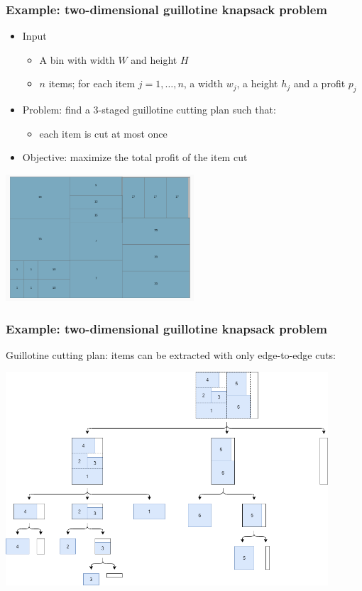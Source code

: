 \documentclass[10pt]{beamer}
\begin{document}
\begin{frame}
  \frametitle{Example: two-dimensional guillotine knapsack problem}

  \begin{itemize}
    \item Input
      \begin{itemize}
        \item A bin with width $W$ and height $H$
        \item $n$ items; for each item $j = 1, \dots, n$, a width $w_j$, a height $h_j$ and a profit $p_j$
      \end{itemize}
    \item Problem: find a 3-staged guillotine cutting plan such that:
      \begin{itemize}
        \item each item is cut at most once
      \end{itemize}
    \item Objective: maximize the total profit of the item cut
  \end{itemize}

  \begin{center}
    \includegraphics[width=7cm]{img/packing_guillotine.png}
  \end{center}
\end{frame}

\begin{frame}
  \frametitle{Example: two-dimensional guillotine knapsack problem}

  Guillotine cutting plan: items can be extracted with only edge-to-edge cuts:
  \begin{center}
    \includegraphics[width=0.9\textwidth]{img/guillotine_cutting.png}
  \end{center}
\end{frame}
\end{document}
